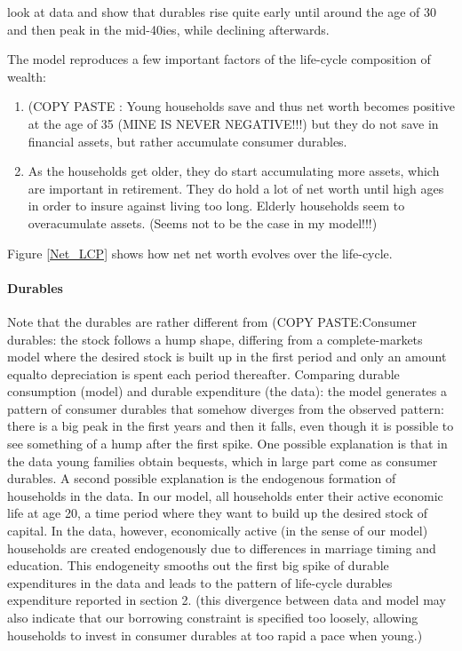 \documentclass[a4paper,12pt,legno]{article}
\begin{document}
\citep{FV&K2011} look at data and show that durables rise quite early until around the age of 30 and then peak in the mid-40ies, while declining afterwards. 

The model reproduces a few important factors of the life-cycle composition of wealth:
\begin{enumerate}
\item (COPY PASTE \citep{FV&K2011}: Young households save and thus net worth becomes positive at the age of 35 (MINE IS NEVER NEGATIVE!!!) but they do not save in financial assets, but rather accumulate consumer durables.
\item As the households get older, they do start accumulating more assets, which are important in retirement. They do hold a lot of net worth until high ages in order to insure against living too long. 
Elderly households seem to overacumulate assets. (Seems not to be the case in my model!!!)
\end{enumerate}

Figure \ref{Net_LCP} shows how net net worth evolves over the life-cycle. 


\paragraph{Durables}
Note that the durables are rather different from \citep{FV&K2011} (COPY PASTE:Consumer durables: the stock follows a hump shape, differing from a complete-markets model where the desired stock is built up in the first period and only an amount equalto depreciation is spent each period thereafter. 
Comparing durable consumption (model) and durable expenditure (the data): the model generates a pattern of consumer durables that somehow diverges from the observed pattern: there is a big peak in the first years and then it falls, even though it is possible to see something of a hump after the first spike. 
One possible explanation is that in the data young families obtain bequests, which in large part come as consumer durables. 
A second possible explanation is the endogenous formation of households in the data. In our model, all households enter their active economic life at age 20, a time period where they want to build up the desired stock of capital. In the data, however, economically active (in the sense of our model) households are created endogenously due to differences in marriage timing and education. This endogeneity smooths out the first big spike of durable expenditures in the data and leads to the pattern of life-cycle durables expenditure reported in section 2. (this divergence between data and model may also indicate that our borrowing constraint is specified too loosely, allowing households to invest in consumer durables at too rapid a pace when young.)
\end{document}
